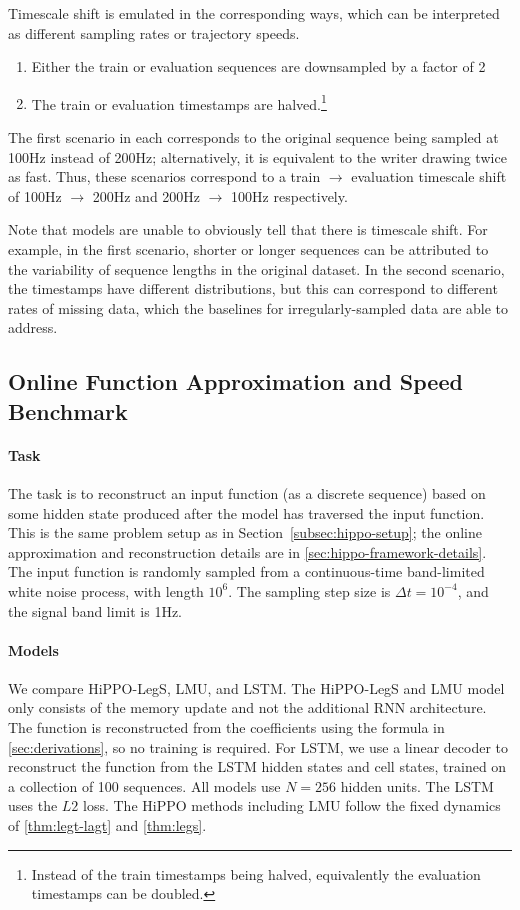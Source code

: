 \documentclass[../hippo.tex]{subfiles}
\begin{document}
Timescale shift is emulated in the corresponding ways, which can be interpreted as different sampling rates or trajectory speeds.
\begin{enumerate}%
    \item Either the train or evaluation sequences are downsampled by a factor of 2
    \item The train or evaluation timestamps are halved.\footnote{Instead of the train timestamps being halved, equivalently the evaluation timestamps can be doubled.}
\end{enumerate}
The first scenario in each corresponds to the original sequence being sampled at 100Hz instead of 200Hz; alternatively, it is equivalent to the writer drawing twice as fast.
Thus, these scenarios correspond to a train $\to$ evaluation timescale shift of 100Hz $\to$ 200Hz and 200Hz $\to$ 100Hz respectively.

Note that models are unable to obviously tell that there is timescale shift.
For example, in the first scenario, shorter or longer sequences can be attributed to the variability of sequence lengths in the original dataset.
In the second scenario, the timestamps have different distributions, but this can correspond to different rates of missing data, which the baselines for irregularly-sampled data are able to address.






\subsection{Online Function Approximation and Speed Benchmark}
\label{subsec:function_approx}

\paragraph{Task} The task is to reconstruct an input function (as a discrete
sequence) based on some hidden state produced after the model has traversed the
input function.
This is the same problem setup as in Section~\ref{subsec:hippo-setup};
the online approximation and reconstruction details are in \cref{sec:hippo-framework-details}.
The input function is randomly sampled from a continuous-time band-limited white
noise process, with length $10^6$.
The sampling step size is $\Delta t = 10^{-4}$, and the signal band limit is 1Hz.

\paragraph{Models} We compare HiPPO-LegS, LMU, and LSTM.
The HiPPO-LegS and LMU model only consists of the memory update and not the
additional RNN architecture.
The function is reconstructed from the coefficients using the formula in
\cref{sec:derivations}, so no training is required.
For LSTM, we use a linear decoder to reconstruct the function from the LSTM
hidden states and cell states, trained on a collection of 100 sequences.
All models use $N = 256$ hidden units.
The LSTM uses the $L2$ loss.
The HiPPO methods including LMU follow the fixed dynamics of \cref{thm:legt-lagt} and \cref{thm:legs}.
\end{document}
